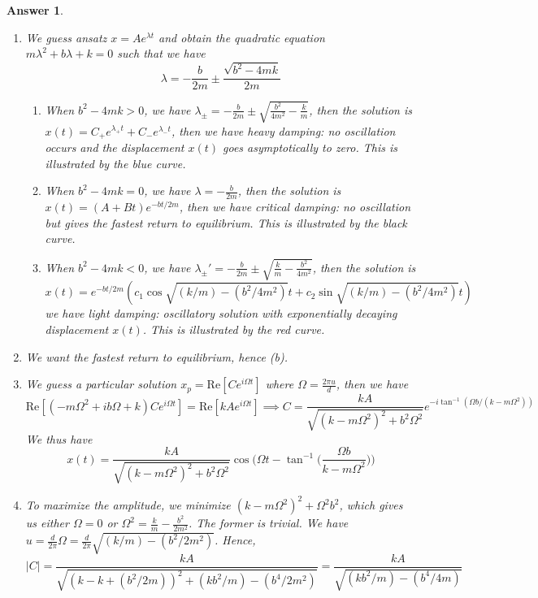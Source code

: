 \documentclass[a4paper]{article}
\newtheorem{ans}{Answer}[subsection]
\theoremstyle{new}
\begin{document}
\begin{ans}\leavevmode
\begin{enumerate}[label=(\roman*)]
\item We guess ansatz $x=Ae^{\lambda t}$ and obtain the quadratic equation $m\lambda^2+b\lambda+k=0$ such that we have
$$\lambda=-\frac{b}{2m}\pm\frac{\sqrt{b^2-4mk}}{2m}$$
\begin{enumerate}[label=(\alph*)]
\item When $b^2-4mk>0$, we have $\lambda_\pm=-\frac{b}{2m}\pm\sqrt{\frac{b^2}{4m^2}-\frac{k}{m}}$, then the solution is $x(t)=C_+e^{\lambda_+t}+C_-e^{\lambda_-t}$, then we have heavy damping: no oscillation occurs and the displacement $x(t)$ goes asymptotically to zero. This is illustrated by the blue curve.
\item When $b^2-4mk=0$, we have $\lambda=-\frac{b}{2m}$, then the solution is $x(t)=(A+Bt)e^{-bt/2m}$, then we have critical damping: no oscillation but gives the fastest return to equilibrium. This is illustrated by the black curve.
\item When $b^2-4mk<0$, we have $\lambda_\pm'=-\frac{b}{2m}\pm\sqrt{\frac{k}{m}-\frac{b^2}{4m^2}}$, then the solution is 
$$x(t)=e^{-bt/2m}(c_1\cos\sqrt{(k/m)-(b^2/4m^2)}t +c_2\sin\sqrt{(k/m)-(b^2/4m^2)}t)$$
we have light damping: oscillatory solution with exponentially decaying displacement $x(t)$.  This is illustrated by the red curve.
\end{enumerate}
\begin{center}
\end{center}
\item We want the fastest return to equilibrium, hence (b).
\item We guess a particular solution $x_p=\text{Re}[Ce^{i\Omega t}]$ where $\Omega=\frac{2\pi u}{d}$, then we have
$$\text{Re}[(-m\Omega^2+ib\Omega +k)Ce^{i\Omega t}]=\text{Re}[kAe^{i\Omega t}]\implies C=\frac{kA}{\sqrt{(k-m\Omega^2)^2+b^2\Omega^2}}e^{-i\tan^{-1}(\Omega b/(k-m\Omega^2))}$$
We thus have $$x(t)=\frac{kA}{\sqrt{(k-m\Omega^2)^2+b^2\Omega^2}}\cos\bigg(\Omega t-\tan^{-1}\bigg(\frac{\Omega b}{k-m\Omega^2}\bigg)\bigg)$$
\item To maximize the amplitude, we minimize $(k-m\Omega^2)^2+\Omega^2b^2$, which gives us either $\Omega=0$ or $\Omega^2=\frac{k}{m}-\frac{b^2}{2m^2}$. The former is trivial. We have $u=\frac{d}{2\pi}\Omega=\frac{d}{2\pi}\sqrt{(k/m)-(b^2/2m^2)}$. Hence,
$$|C|=\frac{kA}{\sqrt{(k-k+(b^2/2m))^2+(kb^2/m)-(b^4/2m^2)}}=\frac{kA}{\sqrt{(kb^2/m)-(b^4/4m)}}$$
\end{enumerate}
\end{ans}
\end{document}
